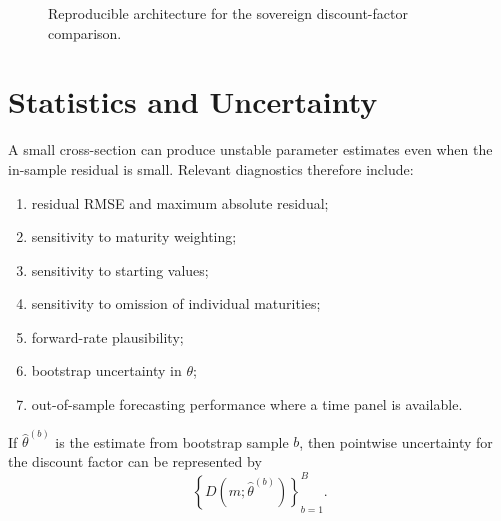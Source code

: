 \documentclass[a4paper,10pt]{article}
\theoremstyle{remark}
\begin{document}
\begin{figure}[H]
\centering
{}
\caption{Reproducible architecture for the sovereign discount-factor comparison.}
\end{figure}

\section{Statistics and Uncertainty}

A small cross-section can produce unstable parameter estimates even when the in-sample residual is small. Relevant diagnostics therefore include:

\begin{enumerate}[label=\alph*.]
\item residual RMSE and maximum absolute residual;
\item sensitivity to maturity weighting;
\item sensitivity to starting values;
\item sensitivity to omission of individual maturities;
\item forward-rate plausibility;
\item bootstrap uncertainty in $\theta$;
\item out-of-sample forecasting performance where a time panel is available.
\end{enumerate}

If $\hat\theta^{(b)}$ is the estimate from bootstrap sample $b$, then pointwise uncertainty for the discount factor can be represented by
\begin{equation}
\left\{D(m;\hat\theta^{(b)})\right\}_{b=1}^B.
\end{equation}
\end{document}
